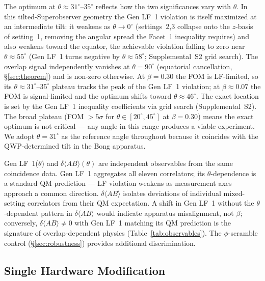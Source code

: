\documentclass[twocolumn,aps,pra,superscriptaddress,floatfix,10pt]{revtex4-2}
\begin{document}
The optimum at $\theta \approx 31^\circ$--$35^\circ$ reflects how the two significances vary with $\theta$.
In this tilted-Superobserver geometry the Gen LF~1 violation is itself maximized at an
intermediate tilt: it weakens as $\theta \to 0^\circ$ (settings~2,3 collapse onto the $z$-basis
of setting~1, removing the angular spread the Facet~1 inequality requires) and also weakens
toward the equator, the achievable violation falling to zero near $\theta \approx 55^\circ$ (Gen LF~1
turns negative by $\theta \approx 58^\circ$; Supplemental~S2 grid search). The overlap signal
independently vanishes at $\theta = 90^\circ$ (equatorial cancellation, \S\ref{sec:theorem}) and is
non-zero otherwise. At $\beta = 0.30$ the FOM is LF-limited, so its $\theta \approx 31^\circ$--$35^\circ$
plateau tracks the peak of the Gen LF~1 violation; at $\beta \approx 0.07$ the FOM is signal-limited
and the optimum shifts toward $\theta \approx 46^\circ$. The exact location is set by the Gen LF~1
inequality coefficients via grid search (Supplemental~S2). The broad plateau
(FOM $> 5\sigma$ for $\theta \in [20^\circ, 45^\circ]$ at $\beta = 0.30$) means the exact optimum is not critical ---
any angle in this range produces a viable experiment. We adopt $\theta = 31^\circ$ as the reference angle throughout
because it coincides with the QWP-determined tilt in the Bong apparatus.

Gen LF~1($\theta$) and $\delta\langle AB\rangle(\theta)$ are independent observables from the same
coincidence data. Gen LF~1 aggregates all eleven correlators; its
$\theta$-dependence is a standard QM prediction --- LF violation weakens as
measurement axes approach a common direction. $\delta\langle AB\rangle$ isolates deviations
of individual mixed-setting correlators from their QM expectation. A
shift in Gen LF~1 without the $\theta$-dependent pattern in $\delta\langle AB\rangle$ would indicate
apparatus misalignment, not $\beta$; conversely, $\delta\langle AB\rangle \neq 0$ with Gen LF~1
matching its QM prediction is the signature of overlap-dependent physics
(Table~\ref{tab:observables}). The $\phi$-scramble control (\S\ref{sec:robustness}) provides additional
discrimination.

\subsection{Single Hardware Modification}
\label{sec:modification}
\end{document}

